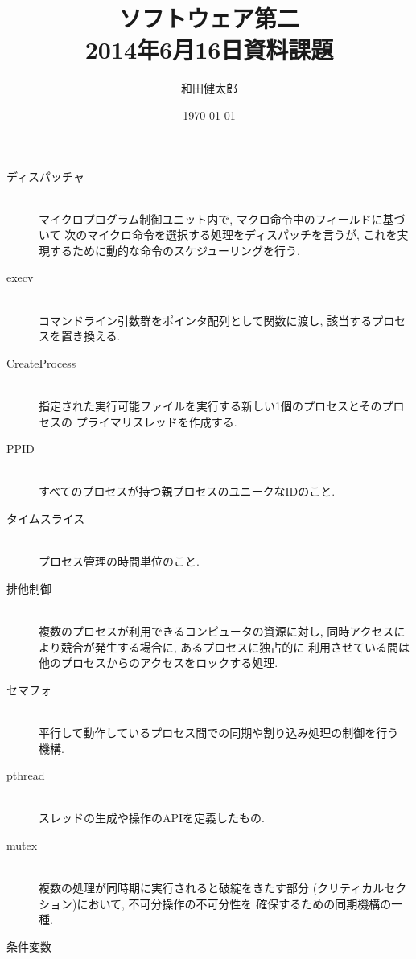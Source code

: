 \documentclass[a4paper, twocolumn]{jarticle}
\title{ソフトウェア第二\\2014年6月16日資料課題}
\author{和田健太郎}
\date{\today}
\begin{document}
\maketitle
\begin{description}
  \item[ディスパッチャ] \mbox{ }\\
    マイクロプログラム制御ユニット内で, マクロ命令中のフィールドに基づいて
    次のマイクロ命令を選択する処理をディスパッチを言うが, 
    これを実現するために動的な命令のスケジューリングを行う. 
    \cite{ref:computer-architecture}
  \item[execv] \mbox{ }\\
    コマンドライン引数群をポインタ配列として関数に渡し, 
    該当するプロセスを置き換える. 
    \cite{ref:exec}
  \item[CreateProcess] \mbox{ }\\
    指定された実行可能ファイルを実行する新しい1個のプロセスとそのプロセスの
    プライマリスレッドを作成する. 
    \cite{ref:create-process}
  \item[PPID] \mbox{ }\\
    すべてのプロセスが持つ親プロセスのユニークなIDのこと. \cite{ref:ppid}
  \item[タイムスライス] \mbox{ }\\
    プロセス管理の時間単位のこと. \cite{ref:time-slice}
  \item[排他制御] \mbox{ }\\
    複数のプロセスが利用できるコンピュータの資源に対し, 
    同時アクセスにより競合が発生する場合に, あるプロセスに独占的に
    利用させている間は他のプロセスからのアクセスをロックする処理. 
    \cite{ref:exclusive-control}
  \item[セマフォ] \mbox{ }\\
    平行して動作しているプロセス間での同期や割り込み処理の制御を行う
    機構. \cite{ref:semaphore}
  \item[pthread] \mbox{ }\\
    スレッドの生成や操作のAPIを定義したもの.
  \item[mutex] \mbox{ }\\
    複数の処理が同時期に実行されると破綻をきたす部分
    (クリティカルセクション)において, 不可分操作の不可分性を
    確保するための同期機構の一種. 
    \cite{ref:mutex}\cite{ref:critical-section}
  \item[条件変数] \mbox{ }\\

\end{description}
\end{document}
